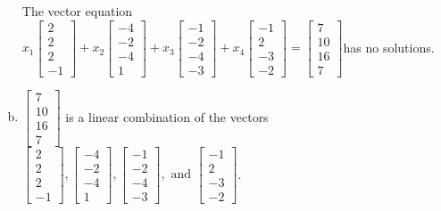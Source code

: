 \begin{exerciseAnswer}
\begin{enumerate}[(a)]
\begin{center}
\begin{minipage}{0.8\textwidth}
 The vector equation \( x_{1} \left[\begin{array}{c}
2 \\
2 \\
2 \\
-1
\end{array}\right] + x_{2} \left[\begin{array}{c}
-4 \\
-2 \\
-4 \\
1
\end{array}\right] + x_{3} \left[\begin{array}{c}
-1 \\
-2 \\
-4 \\
-3
\end{array}\right] + x_{4} \left[\begin{array}{c}
-1 \\
2 \\
-3 \\
-2
\end{array}\right] = \left[\begin{array}{c}
7 \\
10 \\
16 \\
7
\end{array}\right] \)has no solutions.
\end{minipage}\end{center}
    
\item 

\( \left[\begin{array}{c}
7 \\
10 \\
16 \\
7
\end{array}\right] \) is a linear combination of the vectors \( \left[\begin{array}{c}
2 \\
2 \\
2 \\
-1
\end{array}\right] , \left[\begin{array}{c}
-4 \\
-2 \\
-4 \\
1
\end{array}\right] , \left[\begin{array}{c}
-1 \\
-2 \\
-4 \\
-3
\end{array}\right] , \text{ and } \left[\begin{array}{c}
-1 \\
2 \\
-3 \\
-2
\end{array}\right] \). 


\end{enumerate}
    
\end{exerciseAnswer}
    
